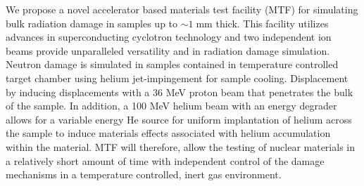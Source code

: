 \documentclass[final,3p,times,twocolumn]{elsarticle} %
\begin{document}
We propose a novel accelerator based materials test facility (MTF) for simulating bulk radiation damage in samples up to $\sim 1\;\mathrm{mm}$ thick.  This facility utilizes advances in superconducting cyclotron technology and two independent ion beams provide unparalleled versatility and in radiation damage simulation.  Neutron damage is simulated in samples contained in temperature controlled target chamber using helium jet-impingement for sample cooling.  Displacement by inducing displacements with a 36 MeV proton beam that penetrates the bulk of the sample.  In addition, a 100 MeV helium beam with an energy degrader allows for a variable energy He source for uniform implantation of helium across the sample to induce materials effects associated with helium accumulation within the material.  MTF will therefore, allow the testing of nuclear materials in a relatively short amount of time with independent control of the damage mechanisms in a temperature controlled, inert gas environment.

 





\end{document}
